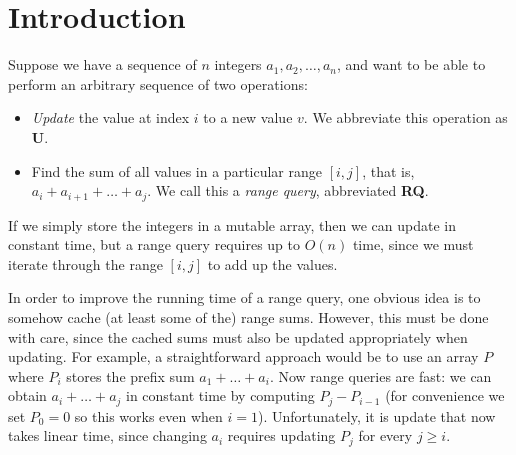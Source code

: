 \documentclass[acmsmall,review]{acmart}\settopmatter{printfolios=true,printccs=false,printacmref=false}
\newcommand{\Up}{\textbf{U}\xspace}
\newcommand{\RQ}{\textbf{RQ}\xspace}
\begin{document}




\maketitle


\section{Introduction}

Suppose we have a sequence of $n$ integers $a_1, a_2, \dots, a_n$, and
want to be able to perform an arbitrary sequence of two operations:

\begin{itemize}
\item \emph{Update} the value at index $i$ to a new value $v$. We
  abbreviate this operation as \Up.
\item Find the sum of all values in a particular range $[i, j]$,
  that is, $a_i + a_{i+1} + \dots + a_j$.  We call this a \emph{range
    query}, abbreviated \RQ.
\end{itemize}

If we simply store the integers in a mutable array, then we can update
in constant time, but a range query requires up to $O(n)$ time, since
we must iterate through the range $[i, j]$ to add up the values.

In order to improve the running time of a range query, one obvious
idea is to somehow cache (at least some of the) range sums.  However,
this must be done with care, since the cached sums must also be
updated appropriately when updating.  For example, a straightforward
approach would be to use an array $P$ where $P_i$ stores the prefix
sum $a_1 + \dots + a_i$.  Now range queries are fast: we can obtain
$a_i + \dots + a_j$ in constant time by computing $P_j - P_{i-1}$ (for
convenience we set $P_0 = 0$ so this works even when $i=1$).
Unfortunately, it is update that now takes linear time, since changing
$a_i$ requires updating $P_j$ for every $j \geq i$.
\end{document}
